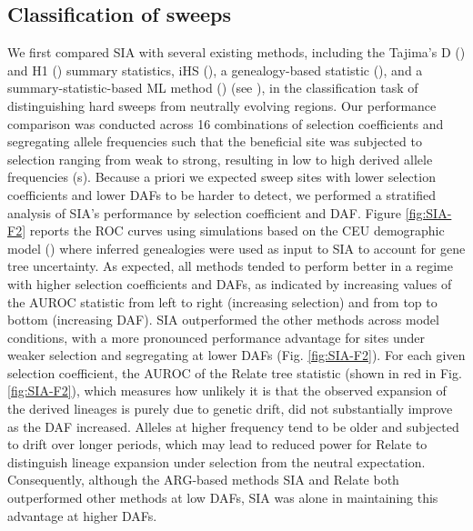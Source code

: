 \subsection{Classification of sweeps}
We first compared \ac{SIA} with several existing methods, including the Tajima’s D (\cite{tajima_statistical_1989}) and H1 (\cite{garud_recent_2015}) summary statistics, iHS (\cite{voight_map_2006}), a genealogy-based statistic (\cite{speidel_method_2019}), and a summary-statistic-based \ac{ML} method (\cite{schrider_shic_2016,kern_diploshic_2018}) (see ), in the classification task of distinguishing hard sweeps from neutrally evolving regions. Our performance comparison was conducted across 16 combinations of selection coefficients and segregating allele frequencies such that the beneficial site was subjected to selection ranging from weak to strong, resulting in low to high derived allele frequencies (s). Because a priori we expected sweep sites with lower selection coefficients and lower \acp{DAF} to be harder to detect, we performed a stratified analysis of \ac{SIA}’s performance by selection coefficient and \ac{DAF}. Figure \ref{fig:SIA-F2} reports the \acf{ROC} curves using simulations based on the CEU demographic model (\cite{tennessen_evolution_2012}) where inferred genealogies were used as input to \ac{SIA} to account for gene tree uncertainty. As expected, all methods tended to perform better in a regime with higher selection coefficients and \acp{DAF}, as indicated by increasing values of the \ac{AUROC} statistic from left to right (increasing selection) and from top to bottom (increasing \ac{DAF}). \ac{SIA} outperformed the other methods across model conditions, with a more pronounced performance advantage for sites under weaker selection and segregating at lower \acp{DAF} (Fig. \ref{fig:SIA-F2}). For each given selection coefficient, the \ac{AUROC} of the Relate tree statistic (shown in red in Fig. \ref{fig:SIA-F2}), which measures how unlikely it is that the observed expansion of the derived lineages is purely due to genetic drift, did not substantially improve as the \ac{DAF} increased. Alleles at higher frequency tend to be older and subjected to drift over longer periods, which may lead to reduced power for Relate to distinguish lineage expansion under selection from the neutral expectation. Consequently, although the \ac{ARG}-based methods \ac{SIA} and Relate both outperformed other methods at low \acp{DAF}, \ac{SIA} was alone in maintaining this advantage at higher \acp{DAF}.

